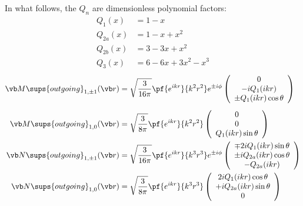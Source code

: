 \documentclass[letterpaper]{article}
\begin{document}
In what follows, the $Q_n$ are dimensionless polynomial factors:
\begin{subequations}
\begin{align}
 Q_1(x) &= 1-x \\
 Q_{2a}(x) &= 1-x+x^2 \\
 Q_{2b}(x) &= 3-3x+x^2 \\
 Q_3(x) &= 6-6x+3x^2-x^3
\end{align}
\end{subequations}
\begin{align*}
 \vb M\sups{outgoing}_{1,\pm 1}(\vb r)
  &=\sqrt\frac{3}{16\pi}\pf{e^{ikr}}{k^2 r^2} e^{\pm i\phi}
    \left(\begin{array}{c}
    0          \\
    -iQ_1(ikr) \\
    \pm Q_1(ikr) \cos\theta 
    \end{array}\right)
\\[5pt]
 \vb M\sups{outgoing}_{1,0}(\vb r)
  &=\sqrt\frac{3}{8\pi}\pf{e^{ikr}}{k^2 r^2}
    \left(\begin{array}{c}
    0       \\
    0       \\
    Q_1(ikr) \sin\theta 
    \end{array}\right)
\\
 \vb N\sups{outgoing}_{1,\pm 1}(\vb r)
  &=\sqrt\frac{3}{16\pi}\pf{e^{ikr}}{k^3 r^3} e^{\pm i\phi}
    \left(\begin{array}{c}
    \mp 2iQ_1(ikr)\sin \theta 			\\
    \pm iQ_{2a}(ikr) \cos\theta			\\
    -Q_{2a}(ikr)
    \end{array}\right)
\\
 \vb N\sups{outgoing}_{1,0}(\vb r)
  &=\sqrt\frac{3}{8\pi}\pf{e^{ikr}}{k^3 r^3}
    \left(\begin{array}{c}
    2iQ_1(ikr)\cos \theta		\\
    +iQ_{2a}(ikr)\sin\theta	\\
    0
    \end{array}\right)
\\[5pt]

\end{align*}
\end{document}
